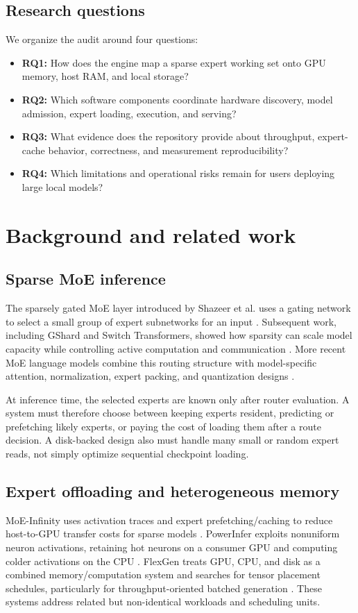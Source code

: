 \documentclass[10pt,twocolumn]{article}
\begin{document}
\subsection{Research questions}
We organize the audit around four questions:
\begin{itemize}
  \item \textbf{RQ1:} How does the engine map a sparse expert working set onto GPU memory, host RAM, and local storage?
  \item \textbf{RQ2:} Which software components coordinate hardware discovery, model admission, expert loading, execution, and serving?
  \item \textbf{RQ3:} What evidence does the repository provide about throughput, expert-cache behavior, correctness, and measurement reproducibility?
  \item \textbf{RQ4:} Which limitations and operational risks remain for users deploying large local models?
\end{itemize}

\section{Background and related work}
\subsection{Sparse MoE inference}
The sparsely gated MoE layer introduced by Shazeer et al. uses a gating network to select a small group of expert subnetworks for an input \cite{shazeer2017}. Subsequent work, including GShard and Switch Transformers, showed how sparsity can scale model capacity while controlling active computation and communication \cite{lepikhin2021,fedus2022}. More recent MoE language models combine this routing structure with model-specific attention, normalization, expert packing, and quantization designs \cite{deepseekv2}.

At inference time, the selected experts are known only after router evaluation. A system must therefore choose between keeping experts resident, predicting or prefetching likely experts, or paying the cost of loading them after a route decision. A disk-backed design also must handle many small or random expert reads, not simply optimize sequential checkpoint loading.

\subsection{Expert offloading and heterogeneous memory}
MoE-Infinity uses activation traces and expert prefetching/caching to reduce host-to-GPU transfer costs for sparse models \cite{xue2024}. PowerInfer exploits nonuniform neuron activations, retaining hot neurons on a consumer GPU and computing colder activations on the CPU \cite{song2024}. FlexGen treats GPU, CPU, and disk as a combined memory/computation system and searches for tensor placement schedules, particularly for throughput-oriented batched generation \cite{sheng2023}. These systems address related but non-identical workloads and scheduling units.
\end{document}
